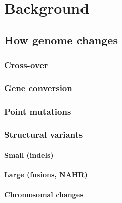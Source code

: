 \chapter{Background}
\label{ch:background}

\section{How genome changes}
\subsection{Cross-over}
\subsection{Gene conversion}
\subsection{Point mutations}
\subsection{Structural variants}
\subsubsection{Small (indels)}
\subsubsection{Large (fusions, NAHR)}
\subsubsection{Chromosomal changes}
